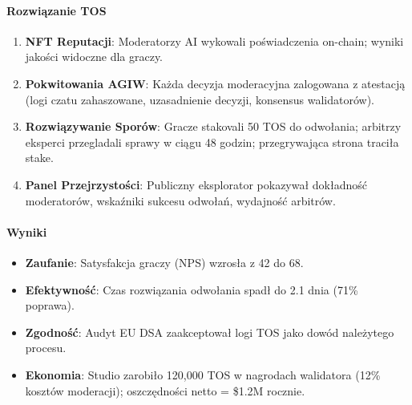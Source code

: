 \documentclass[11pt]{article}
\begin{document}
\paragraph{Rozwiązanie TOS}
\begin{enumerate}[noitemsep]
  \item \textbf{NFT Reputacji}: Moderatorzy AI wykowali poświadczenia on-chain; wyniki jakości widoczne dla graczy.
  \item \textbf{Pokwitowania AGIW}: Każda decyzja moderacyjna zalogowana z atestacją (logi czatu zahaszowane, uzasadnienie decyzji, konsensus walidatorów).
  \item \textbf{Rozwiązywanie Sporów}: Gracze stakovali 50 TOS do odwołania; arbitrzy eksperci przegladali sprawy w ciągu 48 godzin; przegrywająca strona traciła stake.
  \item \textbf{Panel Przejrzystości}: Publiczny eksplorator pokazywał dokładność moderatorów, wskaźniki sukcesu odwołań, wydajność arbitrów.
\end{enumerate}

\paragraph{Wyniki}
\begin{itemize}[noitemsep]
  \item \textbf{Zaufanie}: Satysfakcja graczy (NPS) wzrosła z 42 do 68.
  \item \textbf{Efektywność}: Czas rozwiązania odwołania spadł do 2.1 dnia (71\% poprawa).
  \item \textbf{Zgodność}: Audyt EU DSA zaakceptował logi TOS jako dowód należytego procesu.
  \item \textbf{Ekonomia}: Studio zarobiło 120,000 TOS w nagrodach walidatora (12\% kosztów moderacji); oszczędności netto = \$1.2M rocznie.
\end{itemize}
\end{document}

